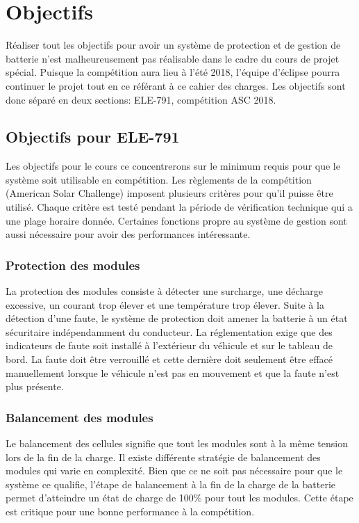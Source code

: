 
\section{Objectifs}
Réaliser tout les objectifs pour avoir un système de protection et de gestion de batterie  n'est malheureusement pas réalisable dans le cadre du cours de projet spécial. Puisque la compétition aura lieu à l'été 2018, l'équipe d'éclipse pourra continuer le projet tout en ce référant à ce cahier des charges. Les objectifs sont donc séparé en deux sections: ELE-791, compétition ASC 2018.  

	\subsection{Objectifs pour ELE-791}	
	Les objectifs pour le cours ce concentrerons sur le minimum requis pour que le système soit utilisable en compétition. Les règlements de la compétition (American Solar Challenge) imposent plusieurs critères pour qu'il puisse être utilisé. Chaque critère est testé pendant la période de vérification technique qui a une plage horaire donnée. Certaines fonctions propre au système de gestion sont aussi nécessaire pour avoir des performances intéressante.
	
		\subsubsection{Protection des modules} \label{protection_module}
		La protection des modules consiste à détecter une surcharge, une décharge excessive, un courant trop élever et une température trop élever. Suite à la détection d'une faute, le système de protection doit amener la batterie à un état sécuritaire indépendamment du conducteur. La réglementation exige que des indicateurs de faute soit installé à l'extérieur du véhicule et sur le tableau de bord. La faute doit être verrouillé et cette dernière doit seulement être effacé manuellement lorsque le véhicule n'est pas en mouvement et que la faute n'est plus présente.
	
		\subsubsection{Balancement des modules}
		Le balancement des cellules signifie que tout les modules sont à la même tension lors de la fin de la charge. Il existe différente stratégie de balancement des modules qui varie en complexité. Bien que ce ne soit pas nécessaire pour que le système ce qualifie, l'étape de balancement à la fin de la charge de la batterie permet d'atteindre un état de charge de 100\% pour tout les modules. Cette étape est critique pour une bonne performance à la compétition. 
				
